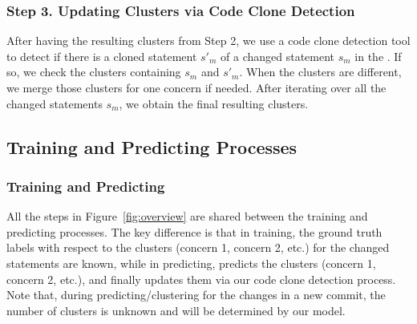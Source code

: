 \subsubsection{{\bf Step 3. Updating Clusters via Code Clone Detection}}

After having the resulting clusters from Step 2, we use a code clone
detection tool to detect if there is a cloned statement $s'_m$ of a
changed statement $s_m$ in the {\mvpdg}. If so, we check the clusters
containing $s_m$ and $s'_m$. When the clusters are different, we merge
those clusters for one concern if needed. After iterating over all the
changed statements $s_m$, we obtain the final resulting clusters.


\subsection{Training and Predicting Processes}
\label{sec:process}


\subsubsection{Training and Predicting}
All the steps in Figure~\ref{fig:overview} are shared between the
training and predicting processes. The key difference is that in
training, the ground truth labels with respect to the clusters
(concern 1, concern 2, etc.) for the changed statements are known,
while in predicting, {\tool} predicts the clusters (concern 1, concern
2, etc.), and finally updates them via our code clone detection
process. Note that, during predicting/clustering for the changes in a
new commit, the number of clusters is unknown and will be determined
by our model.



